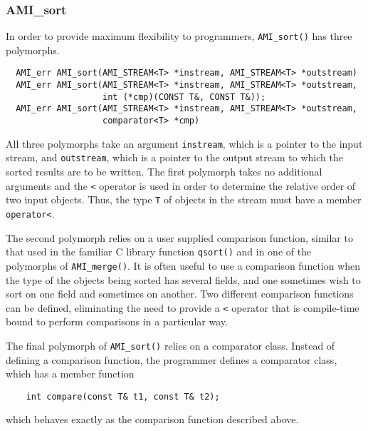 \subsubsection{AMI\_sort}

In order to provide maximum flexibility to programmers, \verb|AMI_sort()|
has three polymorphs.
\begin{verbatim}
  AMI_err AMI_sort(AMI_STREAM<T> *instream, AMI_STREAM<T> *outstream)
  AMI_err AMI_sort(AMI_STREAM<T> *instream, AMI_STREAM<T> *outstream,
                   int (*cmp)(CONST T&, CONST T&));
  AMI_err AMI_sort(AMI_STREAM<T> *instream, AMI_STREAM<T> *outstream,
                   comparator<T> *cmp)
\end{verbatim}

All three polymorphs take an argument \verb|instream|, which is a pointer
to the input stream, and \verb|outstream|, which is a pointer to the output
stream to which the sorted results are to be written. The first polymorph
takes no additional arguments and the \verb|<| operator is used in order to
determine the relative order of two input objects. Thus, the type \verb|T|
of objects in the stream must have a member \verb|operator<|.

The second polymorph relies on a user supplied comparison function, similar
to that used in the familiar C library function \verb|qsort()| and in one
of the polymorphs of \verb|AMI_merge()|. It is often useful to use a
comparison function when the type of the objects being sorted has several
fields, and one sometimes wish to sort on one field and sometimes on
another.  Two different comparison functions can be defined, eliminating
the need to provide a \verb|<| operator that is compile-time bound to
perform comparisons in a particular way.

The final polymorph of \verb|AMI_sort()| relies on a comparator
class.
Instead of defining a comparison function, the programmer defines a
comparator class, which has a member function
\begin{verbatim}
    int compare(const T& t1, const T& t2);
\end{verbatim}
which behaves exactly as the comparison function described above.

